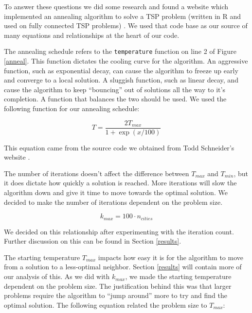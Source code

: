 \documentclass{article}
\def\code#1{\texttt{#1}}
\begin{document}
\begin{multicols}{2}
        To answer these questions we did some research and found a website which implemented an annealing algorithm to solve a TSP problem (written in R and used on fully connected TSP problems) \cite{tspWeb}. We used that code base as our source of many equations and relationships at the heart of our code. 

        The annealing schedule refers to the \code{temperature} function on line 2 of Figure \ref{anneal}. This function dictates the cooling curve for the algorithm. An aggressive function, such as exponential decay, can cause the algorithm to freeze up early and converge to a local solution. A sluggish function, such as linear decay, and cause the algorithm to keep ``bouncing'' out of solutions all the way to it's completion. A function that balances the two should be used. We used the following function for our annealing schedule:

        \begin{equation}
            T = \frac{2T_{max}}{1 + \exp{(x/100)}}
        \end{equation}

        This equation came from the source code we obtained from Todd Schneider's website \cite{tspWeb}.

        The number of iterations doesn't affect the difference between $T_{max}$ and $T_{min}$, but it does dictate how quickly a solution is reached. More iterations will slow the algorithm down and give it time to move towards the optimal solution. We decided to make the number of iterations dependent on the problem size.

        \begin{equation}
            k_{max} = 100\cdot n_{cities}
        \end{equation}

        We decided on this relationship after experimenting with the iteration count. Further discussion on this can be found in Section \ref{results}.

        The starting temperature $T_{max}$ impacts how easy it is for the algorithm to move from a solution to a less-optimal neighbor. Section \ref{results} will contain more of our analysis of this. As we did with $k_{max}$, we made the starting temperature dependent on the problem size. The justification behind this was that larger problems require the algorithm to ``jump around'' more to try and find the optimal solution. The following equation related the problem size to $T_{max}$:


\end{multicols}
\end{document}
